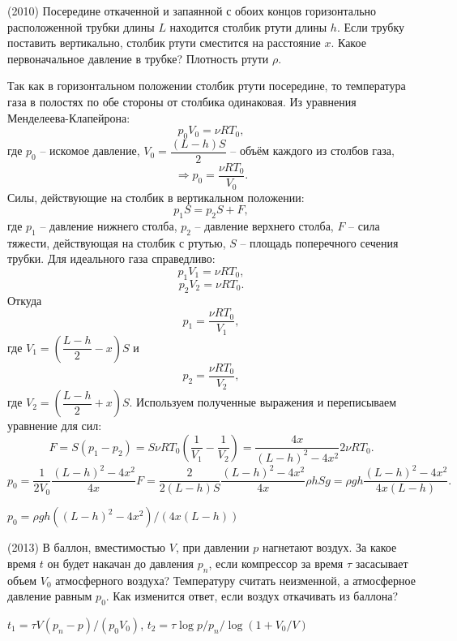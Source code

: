 \begin{ex}
(2010) Посередине откаченной и запаянной с обоих концов горизонтально расположенной трубки длины $L$ находится столбик ртути длины $h$. 
Если трубку поставить вертикально, столбик ртути сместится на расстояние $x$. Какое первоначальное давление в трубке? Плотность ртути $\rho$.
\begin{sol}
Так как в горизонтальном положении столбик ртути посередине, то температура газа в полостях по обе стороны от столбика одинаковая. Из уравнения Менделеева-Клапейрона: $$p_{0}V_{0}=\nu RT_{0},$$ где $p_{0}$ -- искомое давление, $V_{0} = \dfrac{(L-h)S}{2}$ -- объём каждого из столбов газа,
$$\Rightarrow p_{0} = \dfrac{\nu RT_{0}}{V_{0}}.$$
Силы, действующие на столбик в вертикальном положении: $$p_{1}S=p_{2}S+F,$$ где $p_{1}$ -- давление нижнего столба, $p_{2}$ -- давление верхнего столба, $F$ -- сила тяжести, действующая на столбик с ртутью, $S$ -- площадь поперечного сечения трубки.
Для идеального газа справедливо: $$p_{1}V_{1} = \nu RT_{0},$$ $$p_{2}V_{2}=\nu RT_{0}.$$ Откуда $$p_{1} = \dfrac{\nu RT_{0}}{V_{1}},$$ где $V_{1} = \left(\dfrac{L-h}{2}-x\right)S$ и $$p_{2} = \dfrac{\nu RT_{0}}{V_{2}},$$ где $V_{2} = \left(\dfrac{L-h}{2}+x\right)S$.
Используем полученные выражения и переписываем уравнение для сил: $$F = S(p_{1} - p_{2}) = S \nu RT_{0}\left(\dfrac{1}{V_{1}}-\dfrac{1}{V_{2}}\right)=\dfrac{4x}{(L-h)^2-4x^2}2\nu RT_{0}.$$
$$p_{0} = \dfrac{1}{2V_{0}} \dfrac{(L-h)^2-4x^2}{4x}F= \dfrac{2}{2(L-h)S} \dfrac{(L-h)^2-4x^2}{4x}\rho hSg = \rho gh\dfrac{(L-h)^2-4x^2}{4x(L-h)}.$$
\end{sol}
\begin{ans}
$p_0 = \rho g h \left( (L-h)^2 - 4x^2 \right)/ (4x(L-h))$
\end{ans}
\end{ex}

\begin{ex}
(2013) В баллон, вместимостью $V$, при давлении $p$ нагнетают воздух. За какое время $t$ он будет накачан до давления $p_n$, если компрессор за время $\tau$ засасывает объем $V_0$ атмосферного воздуха? 
Температуру считать неизменной, а атмосферное давление равным $p_0$. Как изменится ответ, если воздух откачивать из баллона?
\begin{ans}
$t_1 = \tau V(p_n-p)/(p_0V_0)$, $t_2 = \tau \log p/p_n /\log (1+V_0/V)$
\end{ans}
\end{ex}

